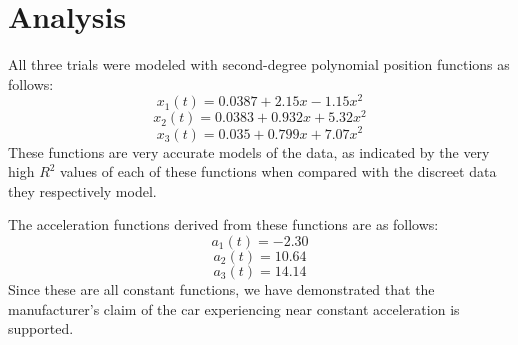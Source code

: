 \documentclass{article}
\begin{document}
\section{Analysis}
All three trials were modeled with second-degree polynomial position functions as follows:
\[x_1(t) = 0.0387 + 2.15x - 1.15x^2\]
\[x_2(t) = 0.0383 + 0.932x + 5.32x^2\]
\[x_3(t) = 0.035 + 0.799x + 7.07x^2\]
These functions are very accurate models of the data, as indicated by the very high $R^2$ values of each of these functions when compared with the discreet data they respectively model.

The acceleration functions derived from these functions are as follows:
\[a_1(t) = -2.30\]
\[a_2(t) = 10.64\]
\[a_3(t) = 14.14\]
Since these are all constant functions, we have demonstrated that the manufacturer's claim of the car experiencing near constant acceleration is supported.
\end{document}
